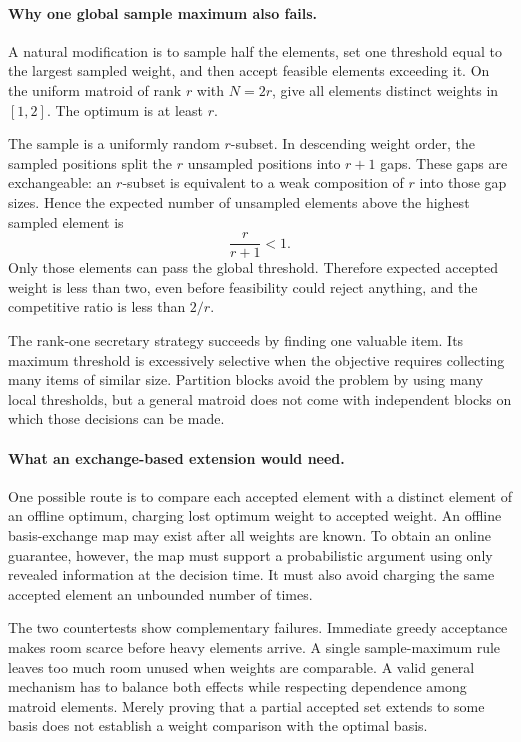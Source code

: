 \documentclass[11pt]{article}
\begin{document}
\paragraph{Why one global sample maximum also fails.}
A natural modification is to sample half the elements, set one threshold equal to the largest sampled weight, and then accept feasible elements exceeding it. On the uniform matroid of rank $r$ with $N=2r$, give all elements distinct weights in $[1,2]$. The optimum is at least $r$.

The sample is a uniformly random $r$-subset. In descending weight order, the sampled positions split the $r$ unsampled positions into $r+1$ gaps. These gaps are exchangeable: an $r$-subset is equivalent to a weak composition of $r$ into those gap sizes. Hence the expected number of unsampled elements above the highest sampled element is
\[
 \frac r{r+1}<1.
\]
Only those elements can pass the global threshold. Therefore expected accepted weight is less than two, even before feasibility could reject anything, and the competitive ratio is less than $2/r$.

The rank-one secretary strategy succeeds by finding one valuable item. Its maximum threshold is excessively selective when the objective requires collecting many items of similar size. Partition blocks avoid the problem by using many local thresholds, but a general matroid does not come with independent blocks on which those decisions can be made.

\paragraph{What an exchange-based extension would need.}
One possible route is to compare each accepted element with a distinct element of an offline optimum, charging lost optimum weight to accepted weight. An offline basis-exchange map may exist after all weights are known. To obtain an online guarantee, however, the map must support a probabilistic argument using only revealed information at the decision time. It must also avoid charging the same accepted element an unbounded number of times.

The two countertests show complementary failures. Immediate greedy acceptance makes room scarce before heavy elements arrive. A single sample-maximum rule leaves too much room unused when weights are comparable. A valid general mechanism has to balance both effects while respecting dependence among matroid elements. Merely proving that a partial accepted set extends to some basis does not establish a weight comparison with the optimal basis.
\end{document}
